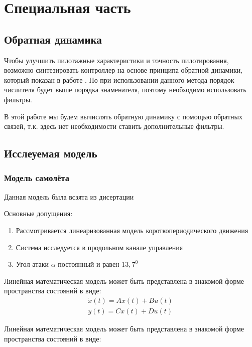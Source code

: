 \newpage
\section{Специальная часть}
\subsection{Обратная динамика}
\pagestyle{fancy}
\fancyhf{}
\rfoot{\thepage}

Чтобы улучшить пилотажные характеристики и точность пилотирования, возможно синтезировать контроллер на основе 
принципа обратной динамики, который показан в работе {\cite{Zoe}}. Но при использовании данного метода порядок числителя будет выше порядка знаменателя, поэтому необходимо использовать фильтры.

В этой работе мы будем вычислять обратную динамику с помощью обратных связей, т.к. здесь нет необходимости ставить дополнительные фильтры.

\subsection{Исслеуемая модель}
\subsubsection{Модель самолёта}

Данная модель была всзята из дисертации {\cite{Diser}}

Основные допущения: 
\begin{enumerate}
    \item Рассмотривается линеаризованная модель короткопериодического движения 
    \item Система исследуется в продольном канале управления
    \item Угол атаки $\alpha$ постоянный и равен $13,7^0$ 
\end{enumerate}

Линейная математическая модель может быть представлена в знакомой форме пространства состояний в виде:
\begin{equation}
    \begin{aligned}
        \dot{x}(t) = Ax(t) + Bu(t) \\
        y(t) = Cx(t) + Du(t)
    \end{aligned}
\end{equation}

Линейная математическая модель может быть представлена в знакомой форме пространства состояний в виде:

